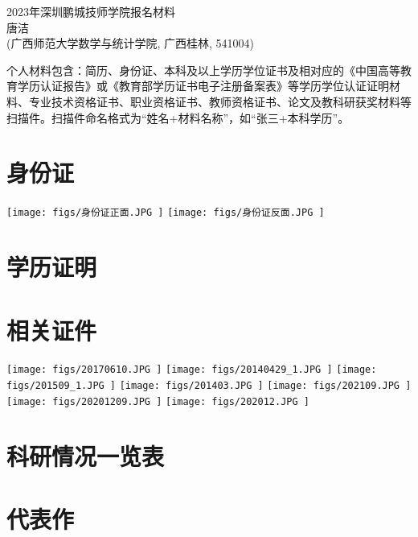\documentclass[UFT8]{ctexart}%
\begin{document}
\thispagestyle{empty} %
\vspace*{3cm}
\begin{center}
{{\LARGE\heiti 2023年深圳鹏城技师学院报名材料}\\[0.6cm]
{\normalsize 唐洁}\\[0.1cm]
{\small(广西师范大学数学与统计学院, 广西桂林, 541004)}}
\end{center}

\clearpage%
\tableofcontents%
\thispagestyle{empty} %

\clearpage%
\setcounter{page}{1}%
个人材料包含：简历、身份证、本科及以上学历学位证书及相对应的《中国高等教育学历认证报告》或《教育部学历证书电子注册备案表》等学历学位认证证明材料、专业技术资格证书、职业资格证书、教师资格证书、论文及教科研获奖材料等扫描件。扫描件命名格式为“姓名+材料名称”，如“张三+本科学历”。


\section{身份证}
\begin{center}
  \texttt{[image: figs/身份证正面.JPG ]}
  \texttt{[image: figs/身份证反面.JPG ]}
\end{center}




\section{学历证明}





\clearpage
\section{相关证件}
\begin{center}
  \texttt{[image: figs/20170610.JPG ]}
  \texttt{[image: figs/20140429\_1.JPG ]}
   \texttt{[image: figs/201509\_1.JPG ]}
   \texttt{[image: figs/201403.JPG ]}
   \texttt{[image: figs/202109.JPG ]}
  \texttt{[image: figs/20201209.JPG ]}
  \texttt{[image: figs/202012.JPG ]}
\end{center}

\clearpage
\section{科研情况一览表}
 


\section{代表作}
 
\end{document}
